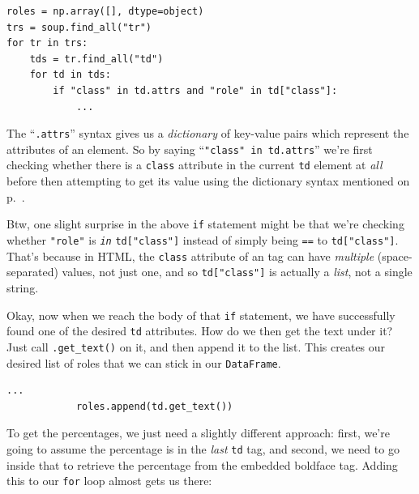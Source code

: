 
\begin{Verbatim}[fontsize=\small,samepage=true,frame=single,framesep=3mm]
roles = np.array([], dtype=object)
trs = soup.find_all("tr")
for tr in trs:
    tds = tr.find_all("td")
    for td in tds:
        if "class" in td.attrs and "role" in td["class"]:
            ...
\end{Verbatim}


The ``\texttt{.attrs}'' syntax gives us a \textit{dictionary} of key-value
pairs which represent the attributes of an element. So by saying
``\texttt{"class" in td.attrs}'' we're first checking whether there is a
\texttt{class} attribute in the current \texttt{td} element at \textit{all}
before then attempting to get its value using the dictionary syntax mentioned
on p.~\pageref{dictSyntax}.

\label{classIsAttribute}

Btw, one slight surprise in the above \texttt{if} statement might be that we're
checking whether \texttt{"role"} is \textit{\texttt{in}} \texttt{td["class"]}
instead of simply being \texttt{==} to \texttt{td["class"]}. That's because in
HTML, the \texttt{class} attribute of an tag can have \textit{multiple}
(space-separated) values, not just one, and so \texttt{td["class"]} is actually
a \textit{list}, not a single string.


Okay, now when we reach the body of that \texttt{if} statement, we have
successfully found one of the desired \texttt{td} attributes. How do we then
get the text under it? Just call \texttt{.get\_text()} on it, and then append
it to the list. This creates our desired list of roles that we can stick in our
\texttt{DataFrame}.

\begin{Verbatim}[fontsize=\small,samepage=true,frame=single,framesep=3mm]
            ...
            roles.append(td.get_text())
\end{Verbatim}

To get the percentages, we just need a slightly different approach: first,
we're going to assume the percentage is in the \textit{last} \texttt{td} tag,
and second, we need to go inside that to retrieve the percentage from the
embedded boldface tag. Adding this to our \texttt{for} loop almost gets us
there:

